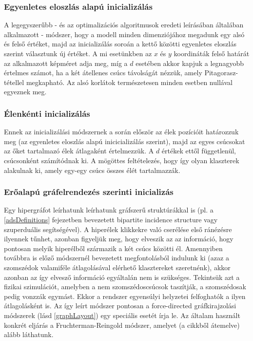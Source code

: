 \subsubsection{Egyenletes eloszlás alapú inicializálás}

A legegyszerűbb - és az optimalizációs algoritmusok eredeti leírásában általában alkalmazott - módszer, hogy a modell minden dimenziójához megadunk egy alsó és felső értéket, majd az inicializálás soroán a kettő közötti egyenletes eloszlás szerint választunk új értéket. A mi esetünkben az $x$ és $y$ koordináták felső határát az alkalmazott képméret adja meg, míg a $d$ esetében akkor kapjuk a legnagyobb értelmes számot, ha a két átellenes csúcs távolságát nézzük, amely Pitagorasz-tétellel megkapható. Az alsó korlátok természetesen minden esetben nullával egyeznek meg.

\subsubsection{Élenkénti inicializálás}

Ennek az inicializálási módszernek a során először az élek pozícióit határozzuk meg (az egyenletes eloszlás alapú inicicializálás szerint), majd az egyes csúcsokat az őket tartalmazó élek átlagaként értelmezzük. A $d$ értékek ettől függetlenül, csúcsonként számítódnak ki. A mögöttes feltételezés, hogy így olyan klaszterek alakulnak ki, amely egy-egy csúcs összes élét tartalmazzák.


\subsubsection{Erőalapú gráfelrendezés szerinti inicializás}

Egy hipergráfot leírhatunk leírhatunk gráfszerű struktúrákkal is (pl. a \ref{adsDefinitions} fejezetben bevezetett bipartite incidence structure vagy szuperduális segítségével). A hiperélek klikkekre való cserélése első ránézésre ilyennek tűnhet, azonban figyeljük meg, hogy elveszik az az információ, hogy pontosan melyik hiperélből származik a két csúcs közötti él. Amennyiben továbbra is előző módszernél bevezetett megfontolásból indulunk ki (azaz a szomszédok valamiféle átlagolásával elérhető klasztereket szeretnénk), akkor azonban az így elvesző információ egyáltalán nem is szükséges. Tekintsük azt a fizikai szimulációt, amelyben a nem szomszédoscsúcsok taszítják, a szomszédosak pedig vonzzák egymást. Ekkor a rendszer egyensúlyi helyzetei felfoghatók a ilyen átlagolásként is. Az így leírt módszer pontosan a force-directed gráfkirajzolási módszerek (lásd \ref{graphLayout}) egy speciális esetét írja le. Az általam használt konkrét eljárás a Fruchterman-Reingold módszer\cite{graph_layout_fruchterman}, amelyet (a cikkből átemelve) alább láthatunk.


